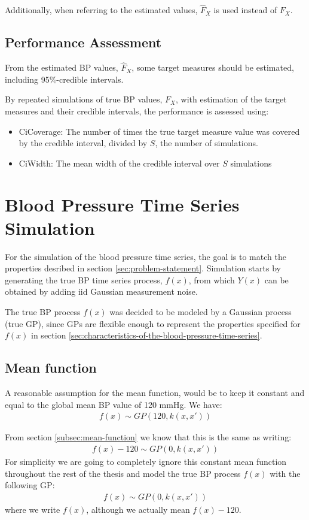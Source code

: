 Additionally, when referring to the estimated values,
$\hat{F}_X$ is used instead of $F_X$.


\subsection{Performance Assessment}
From the estimated BP values, $\hat{F}_X$, some target measures
should be estimated, including 95\%-credible intervals.

By repeated simulations of true BP values, $F_X$, with estimation of the
target measures and their credible intervals, the performance is
assessed using:
\begin{itemize}
    \item CiCoverage: The number of times the true target
    measure value was covered by the credible interval, divided by
    $S$, the number of simulations.
    \item CiWidth: The mean width of the credible interval over $S$ simulations
\end{itemize}


\section{Blood Pressure Time Series Simulation}\label{sec:blood-pressure-time-series-simulation}
For the simulation of the blood pressure time series, the goal is to match the properties
desribed in section \ref{sec:problem-statement}.
Simulation starts by generating the true BP time series process, $f(x)$,
from which $Y(x)$ can be obtained by adding iid Gaussian measurement noise.

The true BP process $f(x)$ was decided to be modeled by a Gaussian process
(true GP),
since GPs are flexible enough to represent the properties
specified for $f(x)$ in section \ref{sec:characteristics-of-the-blood-pressure-time-series}.

\subsection{Mean function}
A reasonable assumption for the mean function, would be to keep it constant and
equal to the global mean BP value of 120 mmHg. We have:
\begin{gather*}
    f(x) \sim GP(120, k(x,x'))
\end{gather*}

From section \ref{subsec:mean-function} we know that this is the same as writing:
\begin{gather*}
    f(x) - 120 \sim GP(0, k(x,x'))
\end{gather*}
For simplicity we are going to completely ignore this constant
mean function throughout the rest of the thesis and
model the true BP process $f(x)$ with the following
GP:
\begin{gather*}
    f(x) \sim GP(0, k(x,x'))
\end{gather*}
where we write $f(x)$, although we actually mean $f(x) - 120$.


